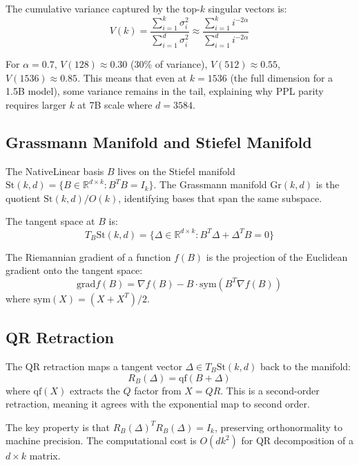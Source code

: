 \documentclass[11pt]{article}
\begin{document}
The cumulative variance captured by the top-$k$ singular vectors is:
\begin{equation}
V(k) = \frac{\sum_{i=1}^k \sigma_i^2}{\sum_{i=1}^d \sigma_i^2} \approx \frac{\sum_{i=1}^k i^{-2\alpha}}{\sum_{i=1}^d i^{-2\alpha}}
\end{equation}

For $\alpha = 0.7$, $V(128) \approx 0.30$ (30\% of variance), $V(512) \approx 0.55$, $V(1536) \approx 0.85$. This means that even at $k=1536$ (the full dimension for a 1.5B model), some variance remains in the tail, explaining why PPL parity requires larger $k$ at 7B scale where $d=3584$.

\subsection{Grassmann Manifold and Stiefel Manifold}

The NativeLinear basis $B$ lives on the Stiefel manifold $\mathrm{St}(k,d) = \{B \in \mathbb{R}^{d \times k} : B^T B = I_k\}$. The Grassmann manifold $\mathrm{Gr}(k,d)$ is the quotient $\mathrm{St}(k,d) / O(k)$, identifying bases that span the same subspace.

The tangent space at $B$ is:
\begin{equation}
T_B \mathrm{St}(k,d) = \{\Delta \in \mathbb{R}^{d \times k} : B^T \Delta + \Delta^T B = 0\}
\end{equation}

The Riemannian gradient of a function $f(B)$ is the projection of the Euclidean gradient onto the tangent space:
\begin{equation}
\mathrm{grad} f(B) = \nabla f(B) - B \cdot \mathrm{sym}(B^T \nabla f(B))
\end{equation}
where $\mathrm{sym}(X) = (X + X^T)/2$.

\subsection{QR Retraction}

The QR retraction maps a tangent vector $\Delta \in T_B \mathrm{St}(k,d)$ back to the manifold:
\begin{equation}
R_B(\Delta) = \mathrm{qf}(B + \Delta)
\end{equation}
where $\mathrm{qf}(X)$ extracts the $Q$ factor from $X = QR$. This is a second-order retraction, meaning it agrees with the exponential map to second order.

The key property is that $R_B(\Delta)^T R_B(\Delta) = I_k$, preserving orthonormality to machine precision. The computational cost is $O(d k^2)$ for QR decomposition of a $d \times k$ matrix.
\end{document}
